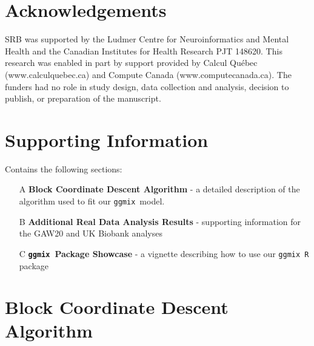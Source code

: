 \documentclass[12pt,letter]{article}\usepackage[]{graphicx}\usepackage[]{color}
\newcommand{\ggmix}{\texttt{ggmix}}
\begin{document}
\section*{Acknowledgements}
SRB was supported by the Ludmer Centre for Neuroinformatics and Mental Health and the Canadian Institutes for Health Research PJT 148620. This research was enabled in part by support provided by Calcul Québec (www.calculquebec.ca) and Compute Canada (www.computecanada.ca). The funders had no role in study design, data collection and analysis, decision to publish, or preparation of the manuscript.

\section*{Supporting Information}
Contains the following sections:
\begin{itemize}
	\item[A] \textbf{Block Coordinate Descent Algorithm} - a detailed description of the algorithm used to fit our \ggmix ~model.
	 \item[B] \textbf{Additional Real Data Analysis Results} - supporting information for the GAW20 and UK Biobank analyses
	\item[C] \textbf{\ggmix ~Package Showcase} - a vignette describing how to use our \ggmix ~\texttt{R} package
\end{itemize}

%
%

%



\newpage

\appendix
{}

\section{Block Coordinate Descent Algorithm} \label{ap:cgd}
\end{document}
